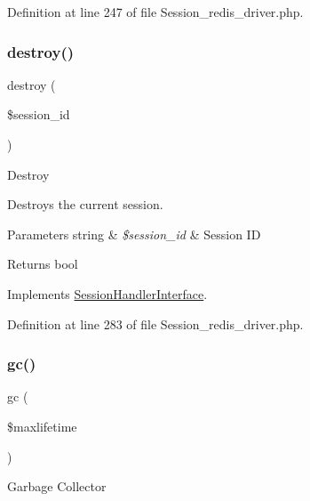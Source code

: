 Definition at line 247 of file Session\+\_\+redis\+\_\+driver.\+php.

\mbox{\label{class_c_i___session__redis__driver_aaec5812f6b4eb6835f88d3baa06a002a}} 
\subsubsection{\texorpdfstring{destroy()}{destroy()}}
{\footnotesize\ttfamily destroy (\begin{DoxyParamCaption}\item[{}]{\$session\+\_\+id }\end{DoxyParamCaption})}

Destroy

Destroys the current session.


\begin{DoxyParams}[1]{Parameters}
string & {\em \$session\+\_\+id} & Session ID \\
\hline
\end{DoxyParams}
\begin{DoxyReturn}{Returns}
bool 
\end{DoxyReturn}


Implements \mbox{\hyperlink{interface_session_handler_interface_aaec5812f6b4eb6835f88d3baa06a002a}{Session\+Handler\+Interface}}.



Definition at line 283 of file Session\+\_\+redis\+\_\+driver.\+php.

\mbox{\label{class_c_i___session__redis__driver_a57aff7ee0656d8aa75d545fb8b3ae35d}} 
\subsubsection{\texorpdfstring{gc()}{gc()}}
{\footnotesize\ttfamily gc (\begin{DoxyParamCaption}\item[{}]{\$maxlifetime }\end{DoxyParamCaption})}

Garbage Collector


